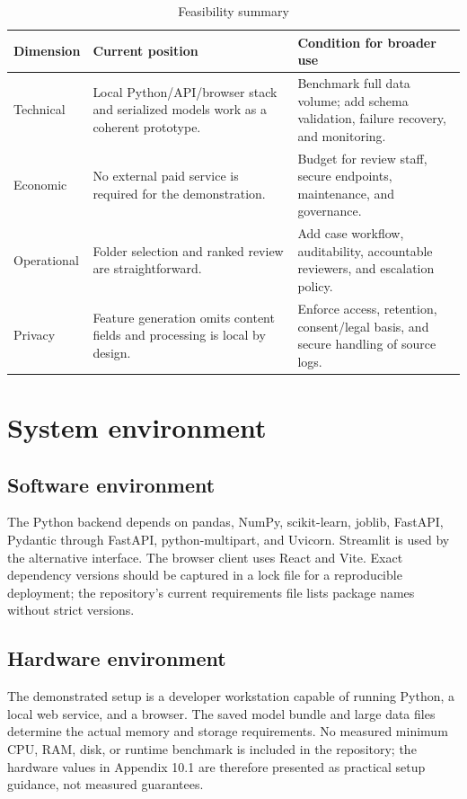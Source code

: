 \begin{table}[H]
\centering
\tablefont
\caption{Feasibility summary}
\label{tab:feasibility}
\begin{tabularx}{\textwidth}{|p{}|Y|Y|}
\hline
\textbf{Dimension} & \textbf{Current position} & \textbf{Condition for broader use}\\\hline
Technical & Local Python/API/browser stack and serialized models work as a coherent prototype. & Benchmark full data volume; add schema validation, failure recovery, and monitoring.\\\hline
Economic & No external paid service is required for the demonstration. & Budget for review staff, secure endpoints, maintenance, and governance.\\\hline
Operational & Folder selection and ranked review are straightforward. & Add case workflow, auditability, accountable reviewers, and escalation policy.\\\hline
Privacy & Feature generation omits content fields and processing is local by design. & Enforce access, retention, consent/legal basis, and secure handling of source logs.\\\hline
\end{tabularx}
\end{table}

\section{System environment}

\subsection{Software environment}
The Python backend depends on pandas, NumPy, scikit-learn, joblib,
FastAPI, Pydantic through FastAPI, python-multipart, and Uvicorn.
Streamlit is used by the alternative interface. The browser client
uses React and Vite. Exact dependency versions should be captured in a
lock file for a reproducible deployment; the repository's current
requirements file lists package names without strict versions.

\subsection{Hardware environment}
The demonstrated setup is a developer workstation capable of running
Python, a local web service, and a browser. The saved model bundle and
large data files determine the actual memory and storage requirements.
No measured minimum CPU, RAM, disk, or runtime benchmark is included in
the repository; the hardware values in Appendix 10.1 are therefore
presented as practical setup guidance, not measured guarantees.

